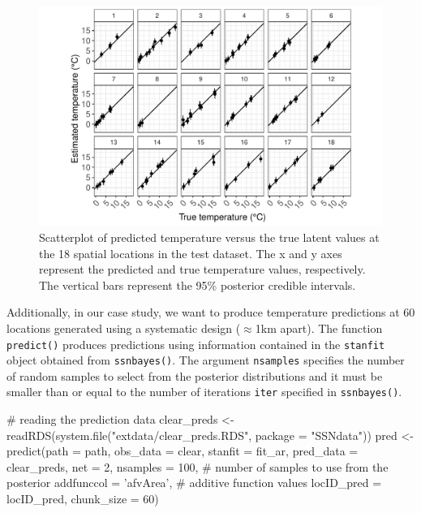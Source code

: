 \begin{figure}[h]
  \centering
   \includegraphics[width=6.0in]{./Figs_Pay/true_vs_estimated.pdf}
  \caption{
  Scatterplot of predicted temperature versus the true latent values at the 18 spatial locations in the test dataset. The x and y axes represent the predicted and true temperature values, respectively. The vertical bars represent the 95\% posterior credible intervals.
  }
  \label{figure:true_vs_estimated}
\end{figure}



Additionally, in our case study, we want to produce temperature predictions at 60 locations generated using a systematic design ($\approx$1km apart). 
The function \texttt{predict()} produces predictions using information contained in the \texttt{stanfit} object obtained from \texttt{ssnbayes()}. The argument  \texttt{nsamples} specifies the number of random samples to select from the posterior distributions and it must be smaller than or equal to the number of iterations  \texttt{iter} specified in \texttt{ssnbayes()}.   


\begin{example}
# reading the prediction data
clear_preds <- readRDS(system.file("extdata/clear_preds.RDS", package = "SSNdata")) 
pred <- predict(path = path,
                      obs_data = clear,
                      stanfit = fit_ar, 
                      pred_data = clear_preds,
                      net = 2,
                      nsamples = 100, # number of samples to use from the posterior 
                      addfunccol = 'afvArea', # additive function values
                      locID_pred = locID_pred,
                      chunk_size = 60)

\end{example}

